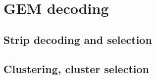 \section{GEM decoding}
\label{decoding}

\subsection{Strip decoding and selection}
\label{strip_sel}


\subsection{Clustering, cluster selection}
\label{clustering}



%
%
%
%

%
%
%
